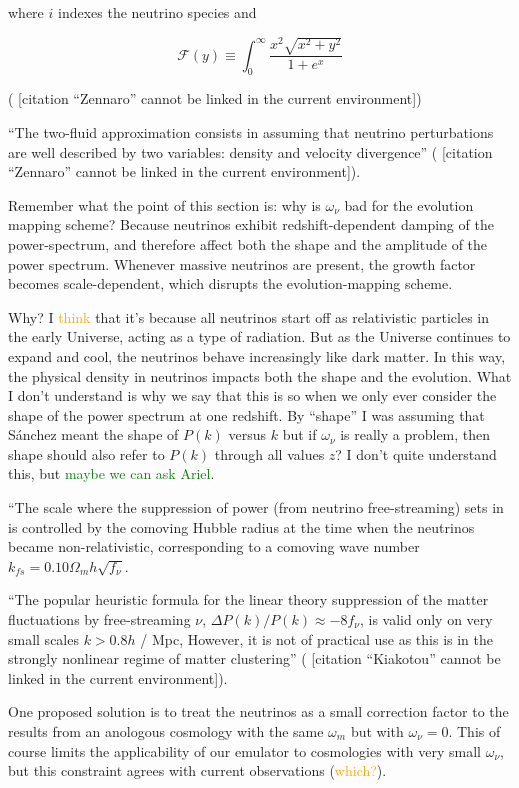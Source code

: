 \documentclass[11pt]{article}
\newcommand{\cbib}[1]
{\IfFileExists{biblatex.sty}
{\cite{#1}}
{[citation ``#1'' cannot be linked in the current environment]}}
\begin{document}
where $i$ indexes the neutrino species and

\begin{equation}
    \mathcal{F}(y) \equiv \int_0^\infty \frac{x^2 \sqrt{x^2 + y^2}}{1 + e^x}
\end{equation}

 (\cbib{Zennaro})

``The two-fluid approximation consists in assuming that neutrino perturbations
are well described by two variables: density and velocity divergence''
(\cbib{Zennaro}).

Remember what the point of this section is: why is $\omega_\nu$ bad for the
evolution mapping scheme? Because neutrinos exhibit redshift-dependent
damping of the power-spectrum, and therefore affect both the shape and the
amplitude of the power spectrum. Whenever massive neutrinos are present,
the growth factor becomes scale-dependent, which disrupts the
evolution-mapping scheme.

Why? I \textcolor{orange}{think} that it's because all neutrinos start off as
relativistic particles in the early Universe, acting as a type of radiation.
But as the Universe continues to expand and cool, the neutrinos behave
increasingly like dark matter.
In this way, the physical density in neutrinos impacts both the shape and the
evolution. What I don't understand is why we say that this is so when we
only ever consider the shape of the power spectrum at one redshift. By
``shape'' I was assuming that S\'{a}nchez meant the shape of $P(k)$ versus
$k$ but if $\omega_\nu$ is really a problem, then shape should also refer
to $P(k)$ through all values $z$? I don't quite understand this, but
\textcolor{green}{maybe we can ask Ariel}.

``The scale where the suppression of power (from neutrino free-streaming) sets
in is controlled by the comoving Hubble radius at the time when the neutrinos
became non-relativistic, corresponding to a comoving wave number
$k_{fs} = 0.10 \Omega_m h \sqrt{f_\nu}$.

``The popular heuristic formula for the linear theory suppression of the matter
fluctuations by free-streaming $\nu$, $\Delta P(k) / P(k) \approx -8 f_\nu$, is
valid only on very small scales $k > 0.8 h$ / Mpc, However, it is not of
practical use as this is in the strongly nonlinear regime of matter
clustering'' (\cbib{Kiakotou}).

One proposed solution is to treat the neutrinos as a small correction factor
to the results from an anologous cosmology with the same $\omega_m$ but with
$\omega_\nu = 0$. This of course limits the applicability of our emulator to
cosmologies with very small $\omega_\nu$, but this constraint agrees with
current observations (\textcolor{orange}{which?}).
\end{document}
